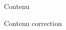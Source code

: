 \begin{exercice}[Titre][\tice]
    Contenu
\end{exercice}
\begin{corrige}
    Contenu correction
\end{corrige}
